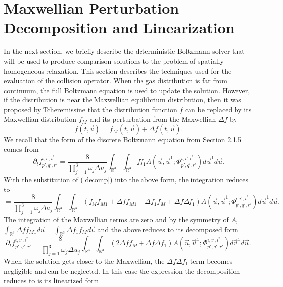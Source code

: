 \section{Maxwellian Perturbation Decomposition and Linearization}
In the next section, we briefly describe the deterministic Boltzmann solver that will be used to produce comparison solutions to the problem of spatially homogeneous relaxation. This section describes the techniques used for the evaluation of the collision operator. When the gas distribution is far from continuum, the full Boltzmann equation is used to update the solution. However, if the distribution is near the Maxwellian equilibrium distribution, then it was proposed by Tcheremissine \cite{tch} that the distribution function $f$ can be replaced by its Maxwellian distribution $f_M$ and its perturbation from the Maxwellian $\Delta f$ by
%
\begin{equation}
\label{decomp}
f(t,\vec{u}) = f_M(t,\vec{u}) + \Delta f(t,\vec{u}).
\end{equation}
%
We recall that the form of the discrete Boltzmann equation from Section 2.1.5 comes from
%
\begin{equation*}
\partial_t f_{p',q',r'}^{i,i',i^*} = \frac{8}{\prod_{j=1}^3 \omega_j \Delta u_j} \int_{\mathbb{R}^3} \int_{\mathbb{R}^3} f f_1 A(\vec{u},\vec{u}^1;\Phi^{i,i',i^*}_{p',q',r'}) d\vec{u}^1 d\vec{u}.
\end{equation*}
%
With the substitution of (\ref{decomp}) into the above form, the integration reduces to
%
\begin{equation*}
= \frac{8}{\prod_{j=1}^3 \omega_j \Delta u_j} \int_{\mathbb{R}^3} \int_{\mathbb{R}^3} \left( f_M f_{M1} + \Delta f f_{M1} + \Delta f_1 f_M + \Delta f \Delta f_1 \right) A(\vec{u},\vec{u}^1;\Phi^{i,i',i^*}_{p',q',r'}) d\vec{u}^1 d\vec{u}.
\end{equation*}
%
The integration of the Maxwellian terms are zero and by the symmetry of $A$,\\ $\int_{\mathbb{R}^3} \Delta f f_{M1} d\vec{u} = \int_{\mathbb{R}^3} \Delta f_1 f_M d\vec{u}$ and the above reduces to its decomposed form
%
\begin{equation*}
\partial_t f_{p',q',r'}^{i,i',i^*} = \frac{8}{\prod_{j=1}^3 \omega_j \Delta u_j} \int_{\mathbb{R}^3} \int_{\mathbb{R}^3} \left( 2 \Delta f f_M + \Delta f \Delta f_1 \right) A(\vec{u},\vec{u}^1;\Phi^{i,i',i^*}_{p',q',r'}) d\vec{u}^1 d\vec{u}.
\end{equation*}
%
When the solution gets closer to the Maxwellian, the $\Delta f \Delta f_1$ term becomes negligible and can be neglected. In this case the expression the decomposition reduces to is its linearized form

